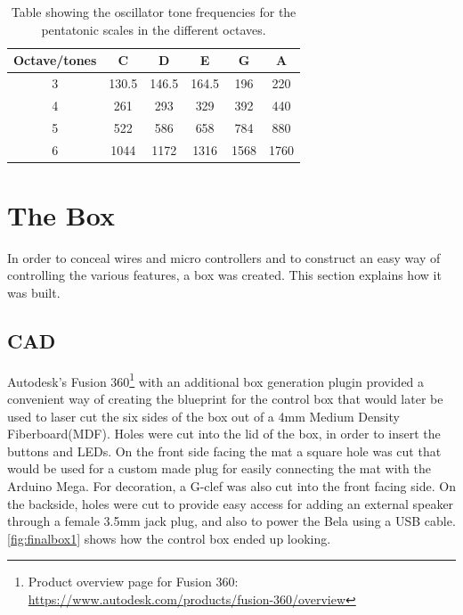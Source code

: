 	\begin{table}[H]
		\centering
		\caption{Table showing the oscillator tone frequencies for the pentatonic scales in the different octaves.}
		\label{tab:toneFreq}
		\begin{tabular}{|c|c|c|c|c|c|}
			\hline
			Octave/tones & C     & D     & E     & G    & A    \\ \hline
			3            & 130.5 & 146.5 & 164.5 & 196  & 220  \\ \hline
			4            & 261   & 293   & 329   & 392  & 440  \\ \hline
			5            & 522   & 586   & 658   & 784  & 880  \\ \hline
			6            & 1044  & 1172  & 1316  & 1568 & 1760 \\ \hline
		\end{tabular}
	\end{table}
	



\section{The Box}%
In order to conceal wires and micro controllers and to construct an easy way of controlling the various features, a box was created. This section explains how it was built.
	\subsection{CAD}
	    Autodesk's Fusion 360\footnote{Product overview page for Fusion 360: \url{https://www.autodesk.com/products/fusion-360/overview}} with an additional box generation plugin provided a convenient way of creating the blueprint for the control box that would later be used to laser cut the six sides of the box out of a 4mm Medium Density Fiberboard(MDF). Holes were cut into the lid of the box, in order to insert the buttons and LEDs. On the front side facing the mat a square hole was cut that would be used for a custom made plug for easily connecting the mat with the Arduino Mega. For decoration, a G-clef was also cut into the front facing side. On the backside, holes were cut to provide easy access for adding an external speaker through a female 3.5mm jack plug, and also to power the Bela using a USB cable. \autoref{fig:finalbox1} shows how the control box ended up looking.
	
